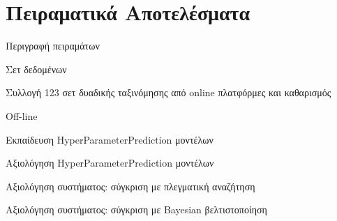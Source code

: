 \documentclass{beamer}
\begin{document}
   \section{Πειραματικά Αποτελέσματα}
  \begin{frame}{Περιγραφή πειραμάτων}
  	\begin{minipage}[t]{.3\textwidth}  		
  		Σετ δεδομένων
  		\vspace{4ex}
  	\end{minipage}%
  	\begin{minipage}[t]{.6\textwidth}
  		Συλλογή 123 σετ δυαδικής ταξινόμησης από online πλατφόρμες και καθαρισμός		  	
  		\vspace{4ex}
  	\end{minipage}
  	\begin{minipage}[t]{.3\textwidth}  		
  		Off-line
  		\vspace{4ex}
  	\end{minipage}%
  	\begin{minipage}[t]{.6\textwidth}
  		Εκπαίδευση HyperParameterPrediction μοντέλων
  		\vspace{4ex} 
  	\end{minipage} 
  \end{frame}
  \begin{frame}{Αξιολόγηση HyperParameterPrediction μοντέλων} 
  	\begin{figure}[!htb]
  		\scalebox{0.6}{
  			}
  	\end{figure}
  \end{frame}
  \begin{frame}{Αξιολόγηση συστήματος: σύγκριση με πλεγματική αναζήτηση} 
  	\begin{figure}[!htb]
  		\scalebox{0.5}{
  			}
  	\end{figure}
  \end{frame}
    \begin{frame}{Αξιολόγηση συστήματος: σύγκριση με Bayesian βελτιστοποίηση} 
    	\begin{figure}[!htb]
    		\scalebox{0.5}{
    			}
    	\end{figure}
    \end{frame}
\end{document}
